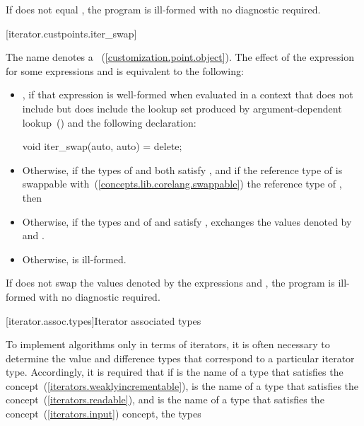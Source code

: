 \pnum
If  does not equal , the program is
ill-formed with no diagnostic required.

[iterator.custpoints.iter_swap]{}

\pnum
The name  denotes a ~(\ref{customization.point.object}). The effect of the expression
 for some expressions  and 
is equivalent to the following:

\begin{itemize}
\item {}, if that expression is well-formed when
evaluated in a context that does not include  but does
include the lookup set produced by argument-dependent
lookup~() and the following declaration:
\begin{codeblock}
void iter_swap(auto, auto) = delete;
\end{codeblock}
\item Otherwise, if the types of  and  both satisfy
, and if the reference type of  is swappable
with~(\ref{concepts.lib.corelang.swappable}) the reference type of ,
then 
\item Otherwise, if the types  and  of  and
 satisfy , exchanges the values denoted by
 and .
\item Otherwise,  is ill-formed.
\end{itemize}

\pnum
If  does not swap the values denoted by the
expressions  and , the program is ill-formed with no
diagnostic required.

[iterator.assoc.types]{Iterator associated types}

\pnum
To implement algorithms only in terms of iterators, it is often necessary to
determine the value and
difference types that correspond to a particular iterator type.
Accordingly, it is required that if
 is the name of a type that
satisfies the  concept~(\ref{iterators.weaklyincrementable}),
 is the name of a type that
satisfies the  concept~(\ref{iterators.readable}), and
 is the name of a type that satisfies the
 concept~(\ref{iterators.input}) concept, the types

